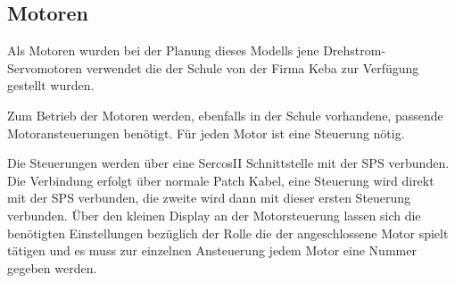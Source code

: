\subsection{Motoren}
Als Motoren wurden bei der Planung dieses Modells jene Drehstrom-Servomotoren verwendet die der Schule von der Firma Keba zur Verfügung gestellt wurden. 

Zum Betrieb der Motoren werden, ebenfalls in der Schule vorhandene, passende Motoransteuerungen benötigt. Für jeden Motor ist eine Steuerung nötig. 

Die Steuerungen werden über eine SercosII Schnittstelle mit der SPS verbunden. Die Verbindung erfolgt über normale Patch Kabel, eine Steuerung wird direkt mit der SPS verbunden, die zweite wird dann mit dieser ersten Steuerung verbunden. Über den kleinen Display an der Motorsteuerung lassen sich die benötigten Einstellungen bezüglich der Rolle die der angeschlossene Motor spielt tätigen und es muss zur einzelnen Ansteuerung jedem Motor eine Nummer gegeben werden.